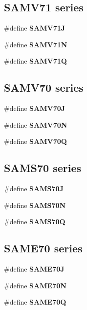 \subsection*{S\+A\+M\+V71 series}
\begin{DoxyCompactItemize}
\item 
\#define {\bfseries S\+A\+M\+V71\+J}
\item 
\#define {\bfseries S\+A\+M\+V71\+N}
\item 
\#define {\bfseries S\+A\+M\+V71\+Q}
\end{DoxyCompactItemize}
\subsection*{S\+A\+M\+V70 series}
\begin{DoxyCompactItemize}
\item 
\#define {\bfseries S\+A\+M\+V70\+J}
\item 
\#define {\bfseries S\+A\+M\+V70\+N}
\item 
\#define {\bfseries S\+A\+M\+V70\+Q}
\end{DoxyCompactItemize}
\subsection*{S\+A\+M\+S70 series}
\begin{DoxyCompactItemize}
\item 
\#define {\bfseries S\+A\+M\+S70\+J}
\item 
\#define {\bfseries S\+A\+M\+S70\+N}
\item 
\#define {\bfseries S\+A\+M\+S70\+Q}
\end{DoxyCompactItemize}
\subsection*{S\+A\+M\+E70 series}
\begin{DoxyCompactItemize}
\item 
\#define {\bfseries S\+A\+M\+E70\+J}
\item 
\#define {\bfseries S\+A\+M\+E70\+N}
\item 
\#define {\bfseries S\+A\+M\+E70\+Q}
\end{DoxyCompactItemize}
